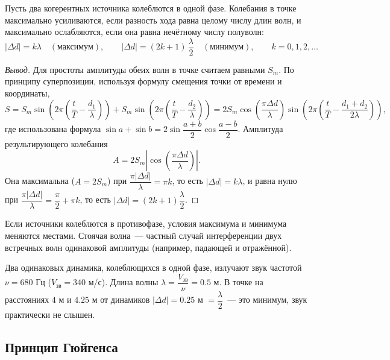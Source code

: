 \documentclass[12pt]{article}
\begin{document}
	\begin{statement}
		Пусть два когерентных источника колеблются в одной фазе. Колебания в точке максимально усиливаются, если разность хода равна целому числу длин волн, и максимально ослабляются, если она равна нечётному числу полуволн:
		\[
			\left| \varDelta d \right| = k\lambda \quad (\text{максимум}), \qquad \left| \varDelta d \right| = (2k + 1)\,\dfrac{\lambda}{2} \quad (\text{минимум}), \qquad k = 0, 1, 2, \dots
		\]
	\end{statement}
	\begin{proof}[Вывод]
		Для простоты амплитуды обеих волн в точке считаем равными $S_m$. По принципу суперпозиции, используя формулу смещения точки от времени и координаты,
		\[
			S = S_m \sin \left( 2\pi \left( \dfrac{t}{T} - \dfrac{d_1}{\lambda} \right) \right) + S_m \sin \left( 2\pi \left( \dfrac{t}{T} - \dfrac{d_2}{\lambda} \right) \right) = 2 S_m \cos \left( \dfrac{\pi \varDelta d}{\lambda} \right) \sin \left( 2\pi \left( \dfrac{t}{T} - \dfrac{d_1 + d_2}{2\lambda} \right) \right),
		\]
		где использована формула $\sin a + \sin b = 2 \sin \dfrac{a + b}{2} \cos \dfrac{a - b}{2}$. Амплитуда результирующего колебания
		\[
			A = 2 S_m \left| \cos \left( \dfrac{\pi \varDelta d}{\lambda} \right) \right|.
		\]
		Она максимальна ($A = 2S_m$) при $\dfrac{\pi \left| \varDelta d \right|}{\lambda} = \pi k$, то есть $\left| \varDelta d \right| = k\lambda$, и равна нулю при $\dfrac{\pi \left| \varDelta d \right|}{\lambda} = \dfrac{\pi}{2} + \pi k$, то есть $\left| \varDelta d \right| = (2k + 1)\dfrac{\lambda}{2}$.
	\end{proof}

	\begin{note}
		Если источники колеблются в противофазе, условия максимума и минимума меняются местами. Стоячая волна~--- частный случай интерференции двух встречных волн одинаковой амплитуды (например, падающей и отражённой).
	\end{note}

	\begin{example}
		Два одинаковых динамика, колеблющихся в одной фазе, излучают звук частотой $\nu = 680$ Гц ($V_{\text{зв}} = 340$ м/с). Длина волны $\lambda = \dfrac{V_{\text{зв}}}{\nu} = 0.5$ м. В точке на расстояниях $4$ м и $4.25$ м от динамиков $\left| \varDelta d \right| = 0.25$ м $= \dfrac{\lambda}{2}$~--- это минимум, звук практически не слышен.
	\end{example}

	\subsection{Принцип Гюйгенса}
\end{document}
